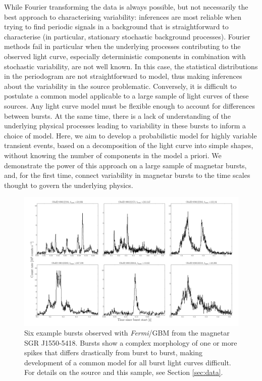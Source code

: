 \documentclass[12pt]{emulateapj}
\newcommand{\project}[1]{\textsl{#1}}
\newcommand{\fermi}{\project{Fermi}}
\begin{document}
While Fourier transforming the data is always possible, but not necessarily the best approach to characterising variability: inferences are most reliable when trying to find
periodic signals in a background that is straightforward to characterise (in particular, stationary stochastic background processes).
Fourier methods fail in particular when the underlying processes contributing to the observed light curve, especially deterministic 
components in combination with stochastic variability, are not well known. In this case,
the statistical distributions in the periodogram are not straightforward to model, thus making inferences about the variability in the source problematic. Conversely, 
it is difficult to postulate a common model applicable to a large sample of light curves of these sources. Any light curve model must be flexible enough to account for differences between bursts. 
At the same time, there is a lack of understanding of the underlying physical processes leading to variability in these bursts to inform a choice of model. Here, we aim to develop a probabilistic 
model for highly variable transient events, based on a decomposition of the light curve into simple shapes, without knowing the number of components in the model a priori. We demonstrate the 
power of this approach on a large sample of magnetar bursts, and, for the first time, connect variability in magnetar bursts to the time scales thought to govern the underlying physics.

\begin{figure}[htbp]
\begin{center}
\includegraphics[width=18cm]{example_bursts.pdf}
\caption{Six example bursts observed with \fermi/GBM from the magnetar SGR J1550-5418. Bursts show a complex morphology of one or more
spikes that differs drastically from burst to burst, making development of a common model for all burst light curves difficult. For details on the source
and this sample, see Section \ref{sec:data}.}
\label{fig:example_bursts}
\end{center}
\end{figure}
\end{document}
